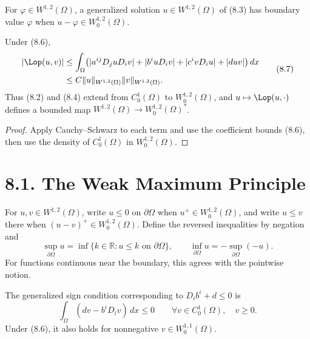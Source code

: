 \begin{definition}
\label{gt-def-8-generalized-dirichlet-problem}
For $\varphi\in W^{1,2}(\Omega)$, a generalized solution $u\in W^{1,2}(\Omega)$
of (8.3) has boundary value $\varphi$ when
$u-\varphi\in W_0^{1,2}(\Omega)$.
\end{definition}

\begin{proposition}
\label{gt-prop-8-bounded-weak-form}
Under (8.6),
\begin{equation}
\begin{split}
|\Lop(u,v)|
&\leq\int_\Omega\bigl(|a^{ij}D_juD_iv|+|b^iuD_iv|
 +|c^ivD_iu|+|duv|\bigr)\,dx\\
&\leq C\|u\|_{W^{1,2}(\Omega)}\|v\|_{W^{1,2}(\Omega)}.
\end{split}
\tag{8.7}
\end{equation}
Thus (8.2) and (8.4) extend from $C_0^1(\Omega)$ to
$W_0^{1,2}(\Omega)$, and $u\mapsto\Lop(u,\cdot)$ defines a bounded map
$W^{1,2}(\Omega)\to W_0^{1,2}(\Omega)^*$.
\end{proposition}
\begin{proof}
\sketch Apply Cauchy--Schwarz to each term and use the coefficient bounds (8.6),
then use the density of $C_0^1(\Omega)$ in $W_0^{1,2}(\Omega)$.
\end{proof}

\section*{8.1. The Weak Maximum Principle}

\begin{definition}
\label{gt-def-8-sobolev-boundary-inequalities}
For $u,v\in W^{1,2}(\Omega)$, write $u\leq0$ on $\partial\Omega$ when
$u^+\in W_0^{1,2}(\Omega)$, and write $u\leq v$ there when
$(u-v)^+\in W_0^{1,2}(\Omega)$. Define the reversed inequalities by negation and
\[
\sup_{\partial\Omega}u=
\inf\{k\in\mathbb R:u\leq k\text{ on }\partial\Omega\},
\qquad
\inf_{\partial\Omega}u=-\sup_{\partial\Omega}(-u).
\]
For functions continuous near the boundary, this agrees with the pointwise notion.
\end{definition}

\begin{convention}
\label{gt-conv-8-weak-zeroth-order-sign}
The generalized sign condition corresponding to $D_ib^i+d\leq0$ is
\begin{equation}
\int_\Omega(dv-b^iD_iv)\,dx\leq0
\qquad\forall v\in C_0^1(\Omega),\quad v\geq0.
\tag{8.8}
\end{equation}
Under (8.6), it also holds for nonnegative $v\in W_0^{1,1}(\Omega)$.
\end{convention}

